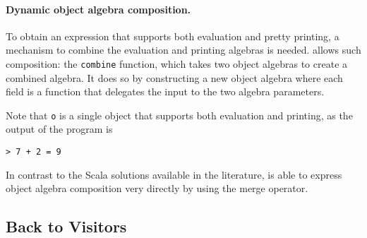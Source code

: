 \paragraph{Dynamic object algebra composition.}
To obtain an expression that supports both evaluation and pretty
printing, a mechanism to combine the evaluation and printing
algebras is needed. \name allows such composition: the \lstinline$combine$
function, which takes two object algebras to create a combined algebra. It
does so by constructing a new object algebra where each field is a
function that delegates the input to the two algebra parameters.
\begin{comment}
  \begin{lstlisting}{language=F2J}
    let combine[A,B](f: ExpAlg[A])(g: ExpAlg[B]) : 
    ExpAlg[A&B] = {
      lit = \(x: Int) -> f.lit x ,, g.lit x,
      add = \(x: A & B) (y: A & B) ->
      f.add x y ,, g.add x y
    }
  \end{lstlisting}
\end{comment}

\begin{comment}
  \begin{lstlisting}{language=F2J}
    let newAlg = 
    combine[IEval,IPrint] subEvalAlg printAlg;
    let o = e1[IEval&IPrint] newAlg;
    o.print ++ " = " ++ o.eval.toString()
  \end{lstlisting}
\end{comment}


Note that \lstinline$o$ is a single object that supports both
evaluation and printing, as the output of the program is
\begin{lstlisting}
> 7 + 2 = 9
\end{lstlisting}

In contrast to the Scala solutions available in the
literature, \name is able to express object algebra
composition very directly by using the merge operator. 

\subsection{Back to Visitors}

